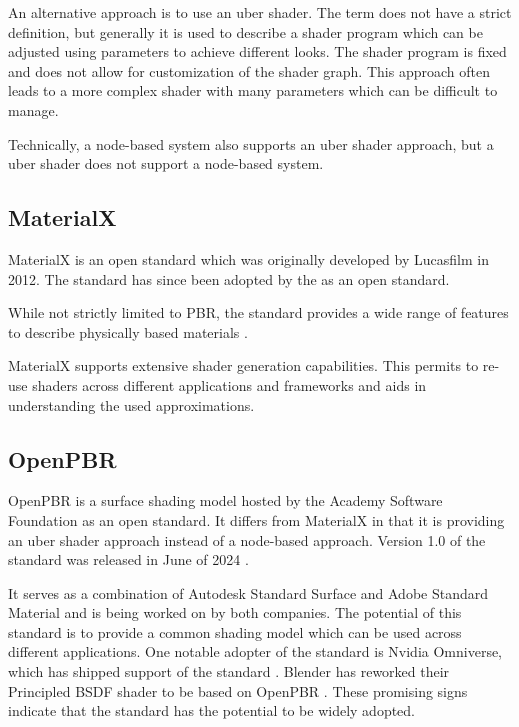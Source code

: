 An alternative approach is to use an \gls{uber shader}. The term does not have a strict definition, but generally it is used to describe a shader program which can be adjusted using parameters to achieve different looks. The shader program is fixed and does not allow for customization of the shader graph. This approach often leads to a more complex shader with many parameters which can be difficult to manage.

Technically, a node-based system also supports an \gls{uber shader} approach, but a \gls{uber shader} does not support a node-based system.

\subsection{MaterialX}

\gls{MaterialX} is an open standard which was originally developed by Lucasfilm in 2012. The standard has since been adopted by the  as an open standard.

While not strictly limited to \gls{PBR}, the standard provides a wide range of features to describe physically based materials \cite{Harrysson2019}.

\gls{MaterialX} supports extensive shader generation capabilities. This permits to re-use shaders across different applications and frameworks and aids in understanding the used approximations.

\subsection{OpenPBR}

\gls{OpenPBR}\cite{openPBRSpec} is a surface shading model hosted by the \gls{Academy Software Foundation} as an open standard. It differs from \gls{MaterialX} in that it is providing an \gls{uber shader} approach instead of a node-based approach. Version 1.0 of the standard was released in June of 2024 \cite{openPBR1Dot0Release}.

It serves as a combination of Autodesk Standard Surface and Adobe Standard Material and is being worked on by both companies. The potential of this standard is to provide a common shading model which can be used across different applications. One notable adopter of the standard is Nvidia Omniverse, which has shipped support of the standard \cite{omniverseOpenPBR}. Blender has reworked their Principled BSDF shader to be based on \gls{OpenPBR} \cite{blenderOpenPBRInspiration}. These promising signs indicate that the standard has the potential to be widely adopted.

